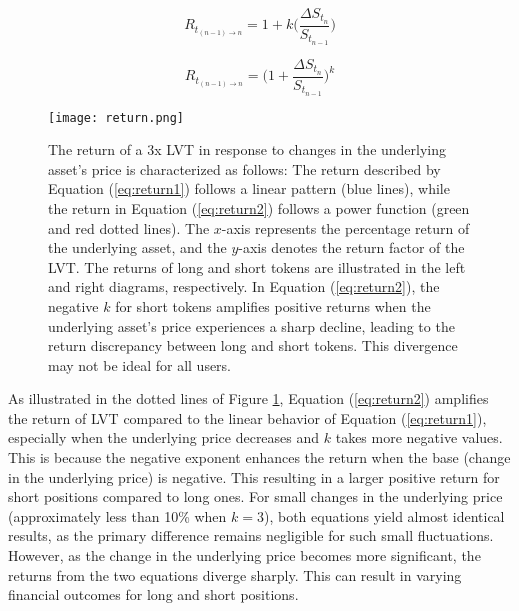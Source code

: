 \noindent
\begin{minipage}{0.5\linewidth}
	\begin{equation}
		R_{t_{(n-1)\to n}}=1+k\Big(\frac{\Delta S_{t_{n}}}{S_{t_{n-1}}}\Big) \label{eq:return1}
	\end{equation}
\end{minipage}
\begin{minipage}{0.5\linewidth}
	\begin{equation}
		R_{t_{(n-1)\to n}}=\Big(1+\frac{\Delta S_{t_{n}}}{S_{t_{n-1}}}\Big)^k \label{eq:return2}
	\end{equation}
\end{minipage}

\begin{figure}[t]
	\texttt{[image: return.png]}
	\caption[LVT return dynamics]{The return of a 3x LVT in response to changes in the underlying asset's price is characterized as follows: The return described by Equation (\ref{eq:return1}) follows a linear pattern (blue lines), while the return in Equation (\ref{eq:return2}) follows a power function (green and red dotted lines). The \(x\)-axis represents the percentage return of the underlying asset, and the \(y\)-axis denotes the return factor of the LVT. The returns of long and short tokens are illustrated in the left and right diagrams, respectively. In Equation (\ref{eq:return2}), the negative \(k\) for short tokens amplifies positive returns when the underlying asset's price experiences a sharp decline, leading to the return discrepancy between long and short tokens. This divergence may not be ideal for all users.}
	\label{fig:return}
\end{figure}

As illustrated in the dotted lines of Figure \ref{fig:return}, Equation (\ref{eq:return2}) amplifies the return of LVT compared to the linear behavior of Equation (\ref{eq:return1}), especially when the underlying price decreases and \(k\) takes more negative values. This is because the negative exponent enhances the return when the base (\ie change in the underlying price) is negative. This resulting in a larger positive return for short positions compared to long ones. For small changes in the underlying price (\eg approximately less than 10\% when \(k = 3\)), both equations yield almost identical results, as the primary difference remains negligible for such small fluctuations. However, as the change in the underlying price becomes more significant, the returns from the two equations diverge sharply. This can result in varying financial outcomes for long and short positions.

